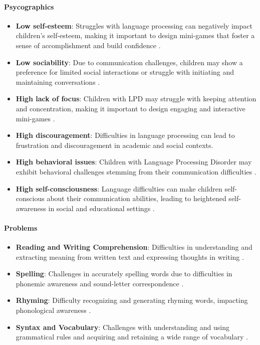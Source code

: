 \paragraph{Psycographics}
\begin{itemize}
    \item \textbf{Low self-esteem}: Struggles with language processing can negatively impact children's self-esteem, making it important to design mini-games that foster a sense of accomplishment and build confidence \cite{vanderbilt}.
    \item \textbf{Low sociability}: Due to communication challenges, children may show a preference for limited social interactions or struggle with initiating and maintaining conversations \cite{greatspeech}.
    \item \textbf{High lack of focus}: Children with LPD may struggle with keeping attention and concentration, making it important to design engaging and interactive mini-games \cite{vanderbilt}.
    \item \textbf{High discouragement}: Difficulties in language processing can lead to frustration and discouragement in academic and social contexts.
    \item \textbf{High behavioral issues}: Children with Language Processing Disorder may exhibit behavioral challenges stemming from their communication difficulties \cite{vanderbilt}.
    \item \textbf{High self-consciousness}: Language difficulties can make children self-conscious about their communication abilities, leading to heightened self-awareness in social and educational settings \cite{additude}.
\end{itemize}

\paragraph{Problems}
\begin{itemize}
    \item \textbf{Reading and Writing Comprehension}: Difficulties in understanding and extracting meaning from written text and expressing thoughts in writing \cite{vanderbilt}.
    \item \textbf{Spelling}: Challenges in accurately spelling words due to difficulties in phonemic awareness and sound-letter correspondence \cite{vanderbilt}.
    \item \textbf{Rhyming}: Difficulty recognizing and generating rhyming words, impacting phonological awareness \cite{vanderbilt}.
    \item \textbf{Syntax and Vocabulary}: Challenges with understanding and using grammatical rules and acquiring and retaining a wide range of vocabulary \cite{additude}.
\end{itemize}


